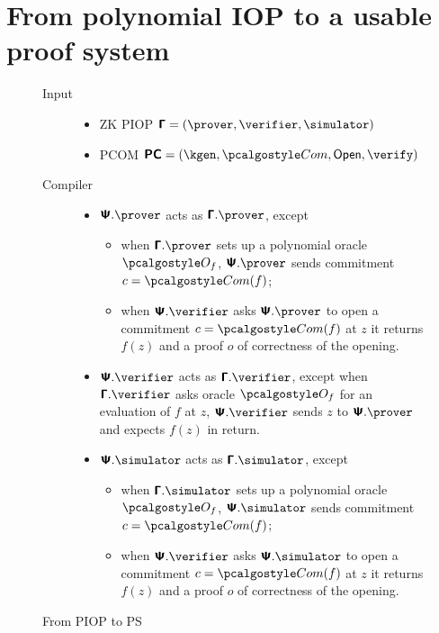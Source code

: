 \documentclass[runningheads,11pt]{llncs}
\begin{document}
\section{From polynomial IOP to a usable proof system}
\begin{figure}
  \centering
    \begin{description}
    \item[Input]
      \begin{itemize}
      \item ZK PIOP $\PIOP = (\prover, \verifier, \simulator)$
      \item PCOM $\PCOM = (\kgen, \com, \open, \verify)$
      \end{itemize}
    \item[Compiler]
      \begin{itemize}
        \item $\PS.\prover$ acts as $\PIOP.\prover$, except
          \begin{itemize}
          \item when $\PIOP.\prover$ sets up a polynomial oracle $\oracleo_f$,
            $\PS.\prover$ sends commitment $c = \com(f)$;
          \item when $\PS.\verifier$ asks $\PS.\prover$ to open a commitment
            $c = \com(f)$ at $z$ it returns $f(z)$ and a proof $o$ of
            correctness of the opening.
          \end{itemize}
        \item $\PS.\verifier$ acts as $\PIOP.\verifier$, except when
          $\PIOP.\verifier$ asks oracle $\oracleo_f$ for an evaluation of $f$ at
          $z$, $\PS.\verifier$ sends $z$ to $\PS.\prover$ and expects $f(z)$
          in return.
        \item $\PS.\simulator$  acts as $\PIOP.\simulator$, except
          \begin{itemize}
          \item when $\PIOP.\simulator$ sets up a polynomial oracle $\oracleo_f$,
            $\PS.\simulator$ sends commitment $c = \com(f)$;
          \item when $\PS.\verifier$ asks $\PS.\simulator$ to open a commitment
            $c = \com(f)$ at $z$ it returns $f(z)$ and a proof $o$ of
            correctness of the opening.
          \end{itemize}
        \end{itemize}
    \end{description}  
  \label{fig:piop_to_ps}
  \caption{From PIOP to PS}
\end{figure}
\end{document}
